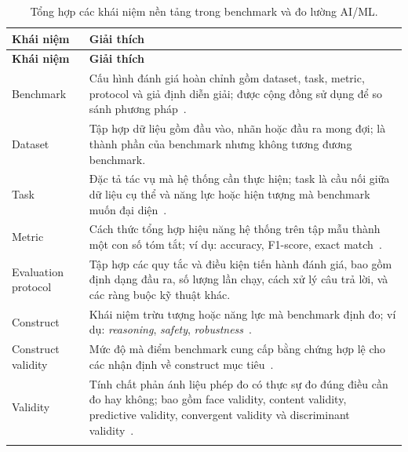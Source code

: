 \begin{longtable}{p{4cm} p{12cm}}
\caption{Tổng hợp các khái niệm nền tảng trong benchmark và đo lường AI/ML.}
\label{tab:concepts} \\

\toprule
\textbf{Khái niệm} & \textbf{Giải thích} \\
\midrule
\endfirsthead

\toprule
\textbf{Khái niệm} & \textbf{Giải thích} \\
\midrule
\endhead

Benchmark &
Cấu hình đánh giá hoàn chỉnh gồm dataset, task, metric, protocol và giả định diễn giải; được cộng đồng sử dụng để so sánh phương pháp~\cite{everything_benchmark, measuring_what_matters}. \\
\addlinespace

Dataset &
Tập hợp dữ liệu gồm đầu vào, nhãn hoặc đầu ra mong đợi; là thành phần của benchmark nhưng không tương đương benchmark. \\
\addlinespace

Task &
Đặc tả tác vụ mà hệ thống cần thực hiện; task là cầu nối giữa dữ liệu cụ thể và năng lực hoặc hiện tượng mà benchmark muốn đại diện~\cite{everything_benchmark, measuring_what_matters}. \\
\addlinespace

Metric &
Cách thức tổng hợp hiệu năng hệ thống trên tập mẫu thành một con số tóm tắt; ví dụ: accuracy, F1-score, exact match~\cite{everything_benchmark}. \\
\addlinespace

Evaluation protocol &
Tập hợp các quy tắc và điều kiện tiến hành đánh giá, bao gồm định dạng đầu ra, số lượng lần chạy, cách xử lý câu trả lời, và các ràng buộc kỹ thuật khác. \\
\addlinespace

Construct &
Khái niệm trừu tượng hoặc năng lực mà benchmark định đo; ví dụ: \textit{reasoning}, \textit{safety}, \textit{robustness}~\cite{measuring_what_matters}. \\
\addlinespace

Construct validity &
Mức độ mà điểm benchmark cung cấp bằng chứng hợp lệ cho các nhận định về construct mục tiêu~\cite{measuring_what_matters, everything_benchmark}. \\
\addlinespace

Validity &
Tính chất phản ánh liệu phép đo có thực sự đo đúng điều cần đo hay không; bao gồm face validity, content validity, predictive validity, convergent validity và discriminant validity~\cite{measuring_what_matters}. \\
\addlinespace


\end{longtable}
